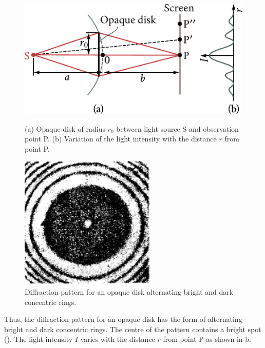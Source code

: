 \begin{figure}[t]
	\begin{minipage}[t]{0.6\linewidth}
		\begin{center}
			\includegraphics[scale=0.9]{figures/ch_18/fig_18_13.pdf}
            \caption[]{(a) Opaque disk of radius $r_0$ between light source S and observation point P. (b) Variation of the light intensity with the distance $r$ from point P.}
			\label{fig:18_13}
		\end{center}
	\end{minipage}
	\hfill{ }%
	\begin{minipage}[t]{0.34\linewidth}
		\begin{center}
			\includegraphics[scale=0.9]{figures/ch_18/fig_18_14.pdf}
			\caption[]{Diffraction pattern for an opaque disk alternating bright and dark concentric rings.}
			\label{fig:18_14}
		\end{center}
	\end{minipage}
\vspace{-0.4cm}
\end{figure}

Thus, the diffraction pattern for an opaque disk has the form of alternating bright and dark concentric rings.
The centre of the pattern contains a bright spot ().
The light intensity $I$ varies with the distance $r$ from point P as shown in b.

